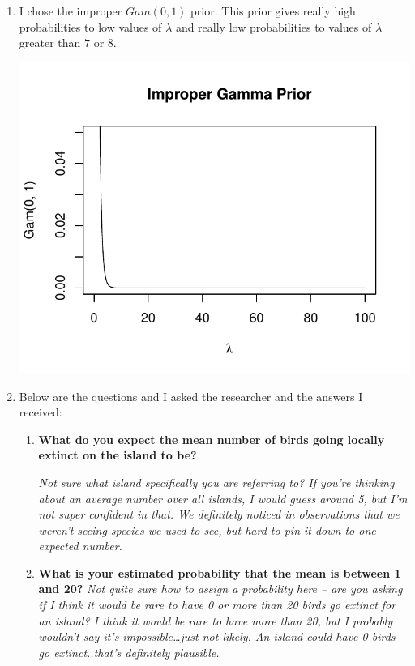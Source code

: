 \documentclass[11pt]{article}\usepackage[]{graphicx}\usepackage[]{color}
\newenvironment{knitrout}{}{} %
\begin{document}
\begin{doublespacing}
\begin{enumerate}
\begin{enumerate}
\begin{enumerate}
\begin{center}
\begin{knitrout}
\end{knitrout}
\end{center}

\item I chose the improper $Gam(0, 1)$ prior. This prior gives really high probabilities to low values of $\lambda$ and really low probabilities to values of $\lambda$ greater than $7$ or $8$. 

\begin{center}
\begin{knitrout}\footnotesize
{}\color{fgcolor}
\includegraphics[width=.5\linewidth]{figure/gammaprior-1} 

\end{knitrout}
\end{center}

\item Below are the questions and I asked the researcher and the answers I received:

\begin{enumerate} 
\item {\bf What do you expect the mean number of birds going locally extinct on the island to be?}

{\it Not sure what island specifically you are referring to?  If you're thinking about an average number over all islands, I would guess around 5, but I'm not super confident in that.  We definitely noticed in observations that we weren't seeing species we used to see, but hard to pin it down to one expected number.}

\item {\bf What is your estimated probability that the mean is between 1 and 20?} 
{\it Not quite sure how to assign a probability here -- are you asking if I think it would be rare to have 0 or more than 20 birds go extinct for an island?  I think it would be rare to have more than 20, but I probably wouldn't say it's impossible…just not likely.  An island could have 0 birds go extinct..that's definitely plausible.}


\end{enumerate}
\end{enumerate}
\end{enumerate}
\end{enumerate}
\end{doublespacing}
\end{document}
